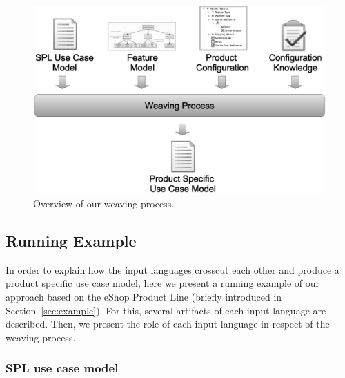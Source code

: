 \documentclass{report}
\begin{document}
\begin{frontmatter}
 

\begin{figure}[h]
 \begin{center}
  \includegraphics[scale=0.35]{img/weave-process2.eps}
  \nocaptionrule \caption{Overview of our weaving process.}
  \label{fig:weave-process}
  \end{center}
\end{figure}

\subsection{Running Example}
\label{sub:running}

In order to explain how the input languages crosscut each other and produce a
product specific use case model, here we present a running example of our
approach based on the eShop Product Line (briefly introduced in
Section~\ref{sec:example}). For this, several artifacts of each input language
are described. Then, we present the role of each input language in respect of the
weaving process.


\subsubsection{SPL use case model}\label{subsub:ucm}


\end{frontmatter}
\end{document}
